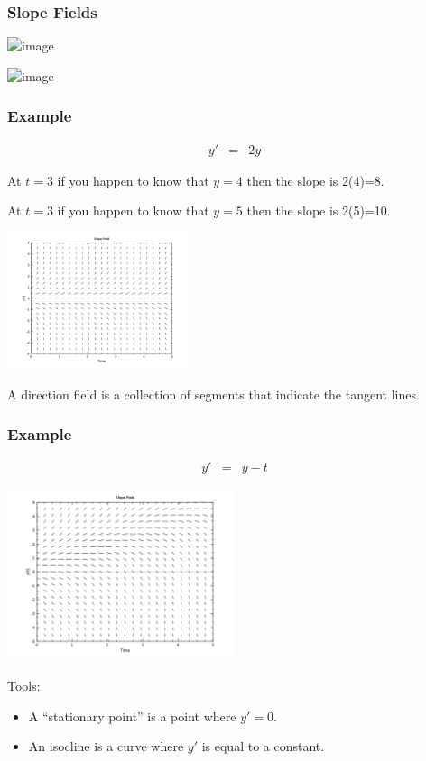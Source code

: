 \begin{frame}
  \frametitle{Slope Fields}

  \includegraphics<1| handout:1>[height=8cm]{img/singlePointInSlopeField}

  \includegraphics<2| handout:2>[height=8cm]{img/singlePointWithSlopeField}

\end{frame}


\begin{frame}
  \frametitle{Example}

  \vspace*{-4em}

  \begin{eqnarray*}
    y' & = & 2y
  \end{eqnarray*}

  At $t=3$ if you happen to know that $y=4$ then the slope is 2(4)=8.

  At $t=3$ if you happen to know that $y=5$ then the slope is 2(5)=10.

  \includegraphics[height=4cm]{img/week1Day2SlopeField}

  A direction field is a collection of segments that indicate the
  tangent lines. 
  
\end{frame}


\begin{frame}
  \frametitle{Example}

  \vspace*{-4em}

  \begin{eqnarray*}
    y' & = & y - t
  \end{eqnarray*}

  \includegraphics[height=5cm]{img/week1Day2SlopeField2}

  Tools:
  \begin{itemize}
  \item A ``stationary point'' is a point where $y'=0$.
  \item An isocline is a curve where $y'$ is equal to a constant.
  \end{itemize}

\end{frame}


